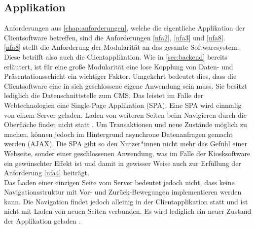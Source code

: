 \subsection{Applikation}
\label{subs:applikation}

Anforderungen aus \autoref{chap:anforderungen}, welche die eigentliche Applikation 
der Clientsoftware betreffen, sind die Anforderungen \ref{nfa2}, \ref{nfa3} und \ref{nfa8}.\\

\ref{nfa8} stellt die Anforderung der Modularität an das gesamte Softwaresystem. Diese
betrifft also auch die Clientapplikation. Wie in \autoref{sec:backend} bereits erläutert, 
ist für eine große Modularität eine lose Kopplung von Daten- und Präsentationsschicht ein
wichtiger Faktor. Umgekehrt bedeutet dies, dass die Clientsoftware eine in sich geschlossene
eigene Anwendung sein muss. Sie besitzt lediglich die Datenschnittstelle zum CMS. Das leistet im 
Falle der Webtechnologien eine Single-Page Applikation (SPA). Eine SPA wird einmalig von einem 
Server geladen. Laden von weiteren Seiten beim Navigieren durch die Oberfläche 
findet nicht statt \cite{js-definitive}. Um Transaktionen und neue Zustände möglich zu machen,
können jedoch im Hintergrund asynchrone Datenanfragen gemacht werden (AJAX). 
Die SPA gibt so den Nutzer*innen nicht mehr das Gefühl einer
Webseite, sonder einer geschlossenen Anwendung, was im Falle der Kiosksoftware ein gewünschter
Effekt ist und damit in gewisser Weise auch zur Erfüllung der Anforderung \ref{nfa4} beiträgt.\\
Das Laden einer einzigen Seite vom Server bedeutet jedoch nicht, dass keine Navigationsstruktur
mit Vor- und Zurück-Bewegungen implementieren werden kann. Die Navigation findet jedoch alleinig in 
der Clientapplikation statt und ist nicht mit Laden von neuen Seiten verbunden. Es wird lediglich
ein neuer Zustand der Applikation geladen \cite{spa-manifesto}.\\

